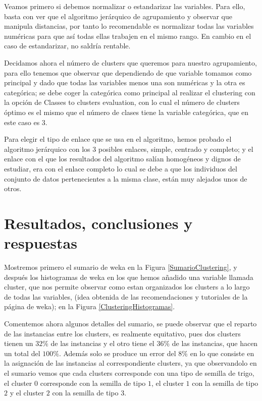 \documentclass[a4paper, 11pt, twoside, openany, onecolumn, final]{memoir}
\begin{document}
	Veamos primero si debemos normalizar o estandarizar las variables. Para ello, basta con ver que el algoritmo jerárquico de agrupamiento y observar que manipula distancias, por tanto lo recomendable es normalizar todas las variables numéricas para que así todas ellas trabajen en el mismo rango. En cambio en el caso de estandarizar, no saldría rentable.  
	
	Decidamos ahora el número de clusters que queremos para nuestro agrupamiento, para ello tenemos que observar que dependiendo de que variable tomamos como principal y dado que todas las variables menos una son numéricas y la otra es categórica; se debe coger la categórica como principal al realizar el clustering con la opción de Classes to clusters evaluation, con lo cual el número de clusters óptimo es el mismo que el número de clases tiene la variable categórica, que en este caso es $3$.
	
	Para elegir el tipo de enlace que se usa en el algoritmo, hemos probado el algoritmo jerárquico con los $3$ posibles enlaces, simple, centrado y completo; y el enlace con el que los resultados del algoritmo salían homogéneos y dignos de estudiar, era con el enlace completo lo cual se debe a que los individuos del conjunto de datos pertenecientes a la misma clase, están muy alejados unos de otros.
	
	\section{Resultados, conclusiones y respuestas}
	Mostremos primero el sumario de weka en la Figura \ref{SumarioClustering}, y después los histogramas de weka en los que hemos añadido una variable llamada cluster, que nos permite observar como estan organizados los clusters a lo largo de todas las variables, (idea obtenida de las recomendaciones y tutoriales de la página de weka); en la Figura \ref{ClusteringHistogramas}.

Comentemos ahora algunos detalles del sumario, se puede observar que el reparto de las instancias entre los clusters, es realmente equitativo, pues dos clusters tienen un $32\%$ de las instancias y el otro tiene el $36\%$ de las instancias, que hacen un total del $100\%$. Además solo se produce un error del $8\%$ en lo que consiste en la asignación de las instancias al correspondiente clusters, ya que observandolo en el sumario vemos que cada clusters corresponde con una tipo de semilla de trigo, el cluster $0$ corresponde con la semilla de tipo $1$, el cluster $1$ con la semilla de tipo $2$ y el cluster $2$ con la semilla de tipo $3$.
\end{document}
